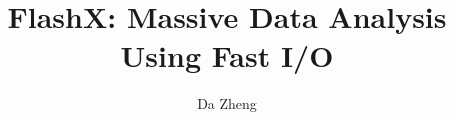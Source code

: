 \documentclass[12pt,oneside,final]{thesis}
\begin{document}
\title{FlashX: Massive Data Analysis Using Fast I/O}
\author{Da Zheng}
\dissertation
\doctorphilosophy
\copyrightnotice









%





\begin{vita}



\end{vita}
\end{document}

